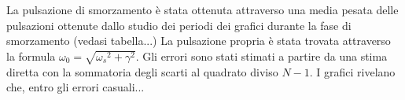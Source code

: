 La pulsazione di smorzamento è stata ottenuta attraverso una media pesata delle pulsazioni ottenute dallo studio dei periodi dei
grafici durante la fase di smorzamento (vedasi tabella...)
La pulsazione propria è stata trovata attraverso la formula $\omega_0 =\sqrt{{\omega_s} ^ 2 + \gamma ^ 2 }$.
Gli errori sono stati stimati a partire da una stima diretta con la sommatoria degli scarti al quadrato diviso $N-1$.
I grafici rivelano che, entro gli errori casuali...


